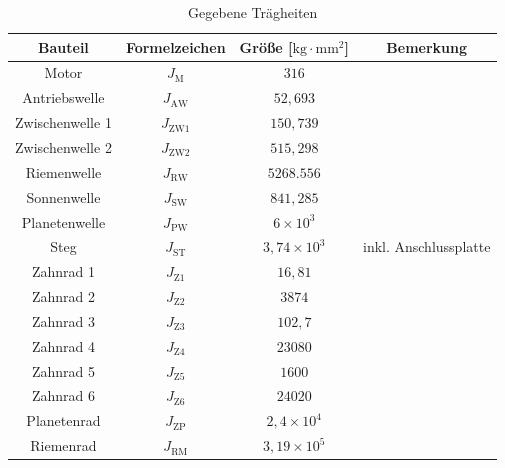 \begin{table}[H]
    \centering
    \caption{Gegebene Trägheiten}
    \begin{tabular}{cccc}
        \toprule
         Bauteil&  Formelzeichen& Größe [$\mathrm{kg\cdot mm^2}$]& Bemerkung\\
         \midrule
         Motor& $J_\mathrm{M}$& $316$& \\
         Antriebswelle& $J_\mathrm{AW}$& $52,693$ & \\
         Zwischenwelle 1& $J_\mathrm{ZW1}$& $150,739$& \\
         Zwischenwelle 2& $J_\mathrm{ZW2}$& $515,298$& \\
         Riemenwelle& $J_\mathrm{RW}$& $5268.556$& \\
         Sonnenwelle& $J_\mathrm{SW}$& $841,285$& \\
         Planetenwelle& $J_\mathrm{PW}$& $6\times10^{3}$& \\
         Steg& $J_\mathrm{ST}$& $3,74\times10^{3}$& inkl. Anschlussplatte\\
         \midrule
         Zahnrad 1& $J_\mathrm{Z1}$& $16,81$& \\
         Zahnrad 2& $J_\mathrm{Z2}$& $3874$& \\
         Zahnrad 3& $J_\mathrm{Z3}$& $102,7$& \\
         Zahnrad 4& $J_\mathrm{Z4}$& $23080$& \\
         Zahnrad 5& $J_\mathrm{Z5}$& $1600$& \\
         Zahnrad 6& $J_\mathrm{Z6}$& $24020$& \\
         Planetenrad& $J_\mathrm{ZP}$& $2,4\times 10^{4}$& \\
         Riemenrad& $J_\mathrm{RM}$& $3,19\times 10^{5}$& \\
         \bottomrule
    \end{tabular}
    \label{Arm Gegeben}
\end{table}\\

